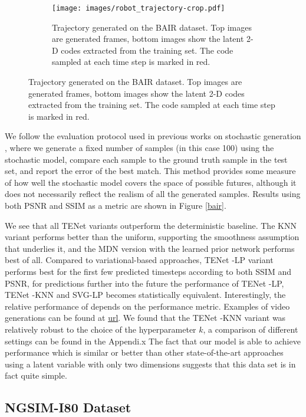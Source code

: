 \documentclass{article}
\newcommand{\modelname}{TENet }
\begin{document}
\begin{figure}
  \centering
  \begin{subfigure}[b]{\textwidth}
    \centering
  \texttt{[image: images/robot\_trajectory-crop.pdf]}
  \caption{Trajectory generated on the BAIR dataset. Top images are generated frames, bottom images show the latent 2-D codes extracted from the training set. The code sampled at each time step is marked in red.}
    \label{robot-trajectory}
  \end{subfigure}
\end{figure}



We follow the evaluation protocol used in previous works on stochastic generation \citep{Walker2016, Babaeizadeh2018, Denton2018}, where we generate a fixed number of samples (in this case 100) using the stochastic model, compare each sample to the ground truth sample in the test set, and report the error of the best match.
This method provides some measure of how well the stochastic model covers the space of possible futures, although it does not necessarily reflect the realism of all the generated samples.
Results using both PSNR and SSIM \citep{SSIM} as a metric are shown in Figure \ref{bair}.

We see that all \modelname variants outperform the deterministic baseline.
The KNN variant performs better than the uniform, supporting the smoothness assumption that underlies it, and the MDN version with the learned prior network performs best of all.
Compared to variational-based approaches, \modelname-LP variant performs best for the first few predicted timesteps according to both SSIM and PSNR, for predictions further into the future the performance of \modelname-LP, \modelname-KNN and SVG-LP becomes statistically equivalent.  Interestingly, the relative performance of \citep{Babaeizadeh2018} depends on the performance metric. Examples of video generations can be found at \url{url}. We found that the \modelname-KNN variant was relatively robust to the choice of the hyperparameter $k$, a comparison of different settings can be found in the Appendi.x
The fact that our model is able to achieve performance which is similar or better than other state-of-the-art approaches using a latent variable with only two dimensions suggests that this data set is in fact quite simple.


\subsection{NGSIM-I80 Dataset}
\end{document}
